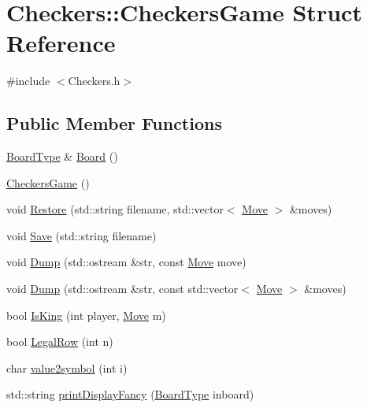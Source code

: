 \hypertarget{structCheckers_1_1CheckersGame}{\section{Checkers\-:\-:Checkers\-Game Struct Reference}
\label{structCheckers_1_1CheckersGame}
}


{\ttfamily \#include $<$Checkers.\-h$>$}

\subsection*{Public Member Functions}
\begin{DoxyCompactItemize}
\item 
\hyperlink{structCheckers_1_1BoardType}{Board\-Type} \& \hyperlink{structCheckers_1_1CheckersGame_a91565d6623c795cc01f260b402ccc762}{Board} ()
\item 
\hyperlink{structCheckers_1_1CheckersGame_a488633616f11a8559af207f7d3c4e99f}{Checkers\-Game} ()
\item 
void \hyperlink{structCheckers_1_1CheckersGame_aa42633ea1ca2000b7f9bb1bbe336a018}{Restore} (std\-::string filename, std\-::vector$<$ \hyperlink{structCheckers_1_1Move}{Move} $>$ \&moves)
\item 
void \hyperlink{structCheckers_1_1CheckersGame_a3674a1bc935578aaa03c3c3954d87ab8}{Save} (std\-::string filename)
\item 
void \hyperlink{structCheckers_1_1CheckersGame_a6bf3de6ce9983fd35a39e0889c399045}{Dump} (std\-::ostream \&str, const \hyperlink{structCheckers_1_1Move}{Move} move)
\item 
void \hyperlink{structCheckers_1_1CheckersGame_af16796dbbb52dcf2ece5e8688fa276e9}{Dump} (std\-::ostream \&str, const std\-::vector$<$ \hyperlink{structCheckers_1_1Move}{Move} $>$ \&moves)
\item 
bool \hyperlink{structCheckers_1_1CheckersGame_aac1fcc4a609456acf8d8a5fdc964e803}{Is\-King} (int player, \hyperlink{structCheckers_1_1Move}{Move} m)
\item 
bool \hyperlink{structCheckers_1_1CheckersGame_a04da4d19584a2b0205c825d56cbb9eea}{Legal\-Row} (int n)
\item 
char \hyperlink{structCheckers_1_1CheckersGame_a11edbc86fd176b63a1df7b64b2519e39}{value2symbol} (int i)
\item 
std\-::string \hyperlink{structCheckers_1_1CheckersGame_a825f16964bb2515b6987b715f1113f8d}{print\-Display\-Fancy} (\hyperlink{structCheckers_1_1BoardType}{Board\-Type} inboard)

\end{DoxyCompactItemize}

